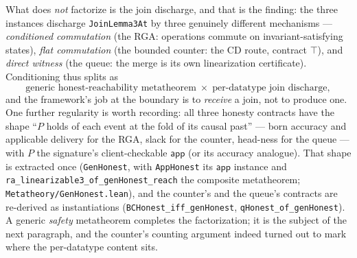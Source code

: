 \documentclass[11pt]{article}
\newcommand{\lean}[1]{\texttt{#1}}
\newcommand{\app}{\mathsf{app}}
\begin{document}
What does \emph{not} factorize is the join discharge, and that is the
finding: the three instances discharge \lean{JoinLemma3At} by three
genuinely different mechanisms --- \emph{conditioned commutation} (the
RGA: operations commute on invariant-satisfying states), \emph{flat
commutation} (the bounded counter: the CD route, contract $\top$), and
\emph{direct witness} (the queue: the merge is its own linearization
certificate). Conditioning thus splits as
\[
  \text{generic honest-reachability metatheorem}
  \;\times\;
  \text{per-datatype join discharge},
\]
and the framework's job at the boundary is to \emph{receive} a join, not
to produce one. One further regularity is worth recording: all three
honesty contracts have the shape ``$P$ holds of each event at the fold of
its causal past'' --- born accuracy and applicable delivery for the RGA,
slack for the counter, head-ness for the queue --- with $P$ the
signature's client-checkable $\app$ (or its accuracy analogue). That shape
is extracted once (\lean{GenHonest}, with \lean{AppHonest} its $\app$
instance and \lean{ra\_linearizable3\_of\_genHonest\_reach} the composite
metatheorem; \lean{Metatheory/GenHonest.lean}), and the counter's and the
queue's contracts are re-derived as instantiations
(\lean{BCHonest\_iff\_genHonest}, \lean{qHonest\_of\_genHonest}). A generic \emph{safety}
metatheorem completes the factorization; it is the subject of the next
paragraph, and the counter's counting argument indeed turned out to mark
where the per-datatype content sits.
\end{document}
